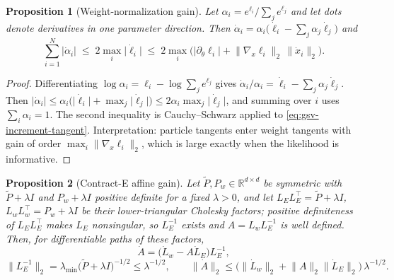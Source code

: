 \documentclass[11pt]{article}
\newtheorem{proposition}{Proposition}[section]
\theoremstyle{definition}
\theoremstyle{remark}
\begin{document}
\begin{proposition}[Weight-normalization gain]
\label{prop:gsv-weight-gain}
Let $\alpha_i=e^{\ell_i}/\sum_j e^{\ell_j}$ and let dots denote derivatives
in one parameter direction.  Then
$\dot\alpha_i=\alpha_i\big(\dot\ell_i-\sum_j\alpha_j\dot\ell_j\big)$ and
\begin{equation}
\label{eq:gsv-weight-gain}
 \sum_{i=1}^N\lvert\dot\alpha_i\rvert
 \;\le\; 2\max_{i}\lvert\dot\ell_i\rvert
 \;\le\; 2\max_i\Big(\lvert\partial_\theta \ell_i\rvert
 +\lVert\nabla_x\ell_i\rVert_2\,\lVert\dot x_i\rVert_2\Big).
\end{equation}
\end{proposition}

\begin{proof}
Differentiating $\log\alpha_i=\ell_i-\log\sum_j e^{\ell_j}$ gives
$\dot\alpha_i/\alpha_i=\dot\ell_i-\sum_j\alpha_j\dot\ell_j$.  Then
$\lvert\dot\alpha_i\rvert\le\alpha_i\big(\lvert\dot\ell_i\rvert
+\max_j\lvert\dot\ell_j\rvert\big)\le2\alpha_i\max_j\lvert\dot\ell_j\rvert$,
and summing over $i$ uses $\sum_i\alpha_i=1$.  The second inequality is
Cauchy--Schwarz applied to \eqref{eq:gsv-increment-tangent}.
Interpretation: particle tangents enter weight tangents with gain of order
$\max_i\lVert\nabla_x\ell_i\rVert_2$, which is large exactly when the
likelihood is informative.
\end{proof}

\begin{proposition}[Contract-E affine gain]
\label{prop:gsv-contract-e-gain}
Let $\widetilde P,P_w\in\mathbb{R}^{d\times d}$ be symmetric with
$\widetilde P+\lambda I$ and $P_w+\lambda I$ positive definite for a fixed
$\lambda>0$, and let
$L_E L_E^{\top}=\widetilde P+\lambda I$,
$L_w L_w^{\top}=P_w+\lambda I$ be their lower-triangular Cholesky factors;
positive definiteness of $L_EL_E^{\top}$ makes $L_E$ nonsingular, so
$L_E^{-1}$ exists and $A=L_w L_E^{-1}$ is well defined.  Then, for
differentiable paths of these factors,
\begin{equation}
\label{eq:gsv-affine-tangent}
 \dot A=\big(\dot L_w-A\dot L_E\big)L_E^{-1},
\end{equation}
\begin{equation}
\label{eq:gsv-affine-gain}
 \bigl\lVert L_E^{-1}\bigr\rVert_2
 =\lambda_{\min}\!\big(\widetilde P+\lambda I\big)^{-1/2}
 \le\lambda^{-1/2},
 \qquad
 \lVert\dot A\rVert_2
 \le\big(\lVert\dot L_w\rVert_2+\lVert A\rVert_2\lVert\dot L_E\rVert_2\big)
 \,\lambda^{-1/2}.
\end{equation}
\end{proposition}
\end{document}

